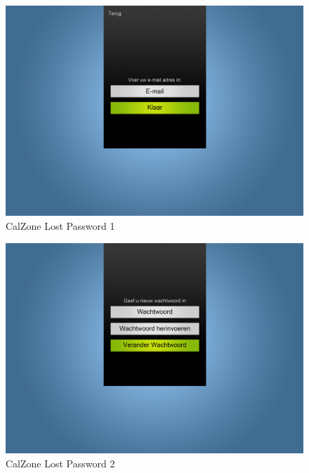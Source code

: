 \begin{center}
\begin{figure}[H]
\caption{CalZone Lost Password 1}
\centerline{\includegraphics[scale=0.4]{img/Calzonelostpassword1}}
\label{fig:CalZone Lost Password 1}
\end{figure}

\begin{figure}[H]
\caption{CalZone Lost Password 2}
\centerline{\includegraphics[scale=0.4]{img/Calzonelostpassword2}}
\label{fig:CalZone Lost Password 2}
\end{figure}


\end{center}
